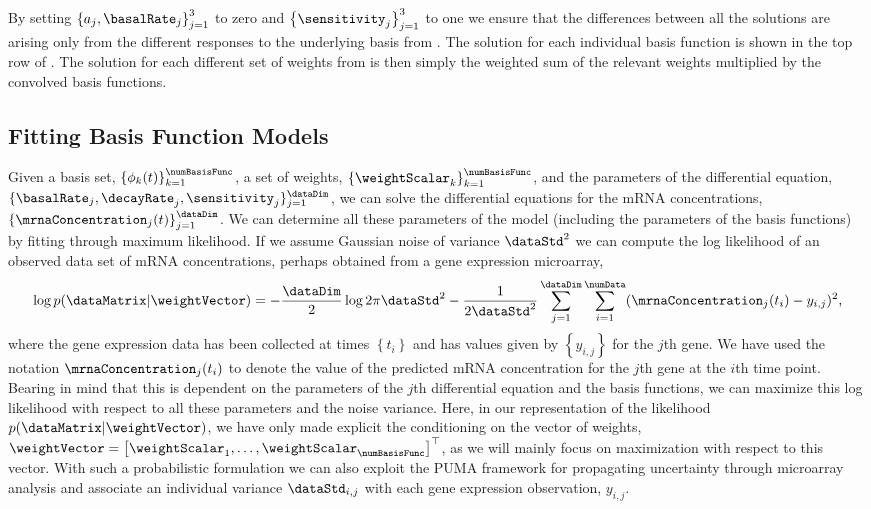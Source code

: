 \documentclass{article}
\begin{document}
By setting $\left\{a_j, \basalRate_j\right\}_{j=1}^3$ to zero and
$\left\{\sensitivity_j\right\}_{j=1}^3$ to one we ensure that the
differences between all the solutions are arising only from the
different responses to the underlying basis from
. The solution for each individual basis
function is shown in the top row of
. The solution for each different set of weights from  is then simply the weighted sum of the relevant weights multiplied by the convolved basis functions.

\subsection{Fitting Basis Function Models}

Given a basis set, $\left\{\phi_k(t)\right\}_{k=1}^\numBasisFunc$, a
set of weights, $\left\{\weightScalar_k\right\}_{k=1}^\numBasisFunc$,
and the parameters of the differential equation, $\{\basalRate_j,
\decayRate_j, \sensitivity_j\}_{j=1}^\dataDim$, we can solve the
differential equations for the mRNA concentrations,
$\left\{\mrnaConcentration_j(t)\right\}_{j=1}^\dataDim$. We can
determine all these parameters of the model (including the parameters
of the basis functions) by fitting through maximum likelihood. If we
assume Gaussian noise of variance $\dataStd^2$ we can compute the log
likelihood of an observed data set of mRNA concentrations, perhaps
obtained from a gene expression microarray,
\[
\log p(\dataMatrix|\weightVector) = -\frac{\dataDim}{2}\log 2\pi\dataStd^2 -\frac{1}{2\dataStd^2}\sum_{j=1}^\dataDim \sum_{i=1}^\numData(\mrnaConcentration_j(t_i) - y_{i,j})^2,
\]
where the gene expression data has been collected at times
$\left\{t_i\right\}$ and has values given by $\left\{y_{i,j}\right\}$
for the $j$th gene. We have used the notation
$\mrnaConcentration_j(t_i)$ to denote the value of the predicted mRNA
concentration for the $j$th gene at the $i$th time point. Bearing in
mind that this is dependent on the parameters of the $j$th
differential equation and the basis functions, we can maximize this
log likelihood with respect to all these parameters and the noise
variance. Here, in our representation of the likelihood $p(\dataMatrix|\weightVector)$, we have only made explicit the conditioning on the vector of weights,  $\weightVector=\left[\weightScalar_1,\dots,\weightScalar_\numBasisFunc\right]^\top$, as we will mainly focus on maximization with respect to this vector. With such a probabilistic formulation we can also exploit
the PUMA \citep{Milo:probabilistic03,Liu:tractable04} framework for
propagating uncertainty through microarray analysis and associate an
individual variance $\dataStd_{i,j}$ with each gene expression
observation, $y_{i,j}$. 
\end{document}
